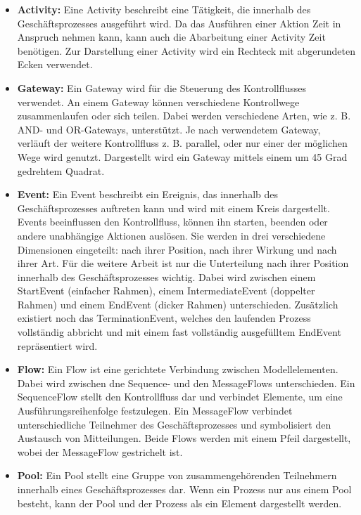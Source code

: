 \begin{itemize}
    \item \textbf{Activity:} 
    Eine Activity beschreibt eine Tätigkeit, die innerhalb des Geschäftsprozesses ausgeführt wird.
    Da das Ausführen einer Aktion Zeit in Anspruch nehmen kann, kann auch die Abarbeitung einer Activity Zeit benötigen.
    Zur Darstellung einer Activity wird ein Rechteck mit abgerundeten Ecken verwendet.
    \item \textbf{Gateway:}
    Ein Gateway wird für die Steuerung des Kontrollflusses verwendet. 
    An einem Gateway können verschiedene Kontrollwege zusammenlaufen oder sich teilen. 
    Dabei werden verschiedene Arten, wie z. B. AND- und OR-Gateways, unterstützt. 
    Je nach verwendetem Gateway, verläuft der weitere Kontrollfluss z. B. parallel, oder nur einer der möglichen Wege wird genutzt.
    Dargestellt wird ein Gateway mittels einem um 45 Grad gedrehtem Quadrat. 
    \item \textbf{Event:}
    Ein Event beschreibt ein Ereignis, das innerhalb des Geschäftsprozesses auftreten kann und wird mit einem Kreis dargestellt.
    Events beeinflussen den Kontrollfluss, können ihn starten, beenden oder andere unabhängige Aktionen auslösen.
    Sie werden in drei verschiedene Dimensionen eingeteilt: nach ihrer Position, nach ihrer Wirkung und nach ihrer Art.
    Für die weitere Arbeit ist nur die Unterteilung nach ihrer Position innerhalb des Geschäftsprozesses wichtig.
    Dabei wird zwischen einem StartEvent (einfacher Rahmen), einem IntermediateEvent (doppelter Rahmen) und einem EndEvent (dicker Rahmen) unterschieden.
    Zusätzlich existiert noch das TerminationEvent, welches den laufenden Prozess vollständig abbricht und mit einem fast vollständig ausgefülltem EndEvent repräsentiert wird.
    \item \textbf{Flow:}
    Ein Flow ist eine gerichtete Verbindung zwischen Modellelementen.
    Dabei wird zwischen dne Sequence- und den MessageFlows unterschieden.
    Ein SequenceFlow stellt den Kontrollfluss dar und verbindet Elemente, um eine Ausführungsreihenfolge festzulegen.
    Ein MessageFlow verbindet unterschiedliche Teilnehmer des Geschäftsprozesses und symbolisiert den Austausch von Mitteilungen.
    Beide Flows werden mit einem Pfeil dargestellt, wobei der MessageFlow gestrichelt ist.
    \item \textbf{Pool:}
    Ein Pool stellt eine Gruppe von zusammengehörenden Teilnehmern innerhalb eines Geschäftsprozesses dar.
    Wenn ein Prozess nur aus einem Pool besteht, kann der Pool und der Prozess als ein Element dargestellt werden.

\end{itemize}
